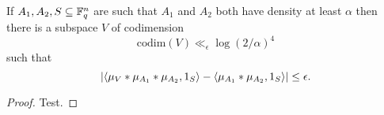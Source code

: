 \begin{theorem}\label{ap_in_ff}
If $A_1,A_2,S\subseteq \mathbb{F}_q^n$ are such that $A_1$ and $A_2$ both have density at least $\alpha$ then there is a subspace $V$ of codimension
\[\mathrm{codim}(V)\ll_\epsilon \log(2/\alpha)^4\]
such that
\[\left\lvert \langle \mu_V\ast \mu_{A_1}\ast \mu_{A_2},1_{S}\rangle-\langle \mu_{A_1}\ast \mu_{A_2},1_{S}\rangle\right\rvert\leq \epsilon.\]
\end{theorem}

\begin{proof}
Test.
\end{proof}
